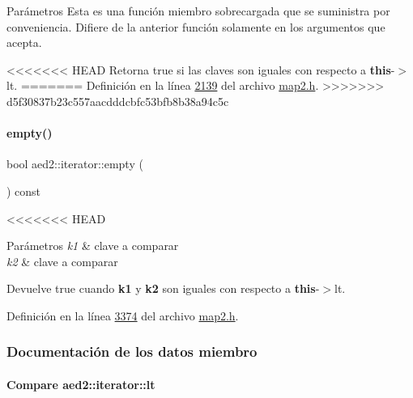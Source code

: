 \begin{DoxyParams}{\-Parámetros}
Esta es una función miembro sobrecargada que se suministra por conveniencia. Difiere de la anterior función solamente en los argumentos que acepta. 

<<<<<<< HEAD
\-Retorna true si las claves son iguales con respecto a {\bfseries this}-\/$>$lt. 
=======
Definición en la línea \hyperlink{map2_8h_source_l02139}{2139} del archivo \hyperlink{map2_8h_source}{map2.\+h}.
>>>>>>> d5f30837b23c557aacdddcbfc53bfb8b38a94c5c

\mbox{\label{classaed2_1_1iterator_a7f98e1c0896c0d960a9dc020a0a4edb8_a7f98e1c0896c0d960a9dc020a0a4edb8}} 
\paragraph{\texorpdfstring{empty()}{empty()}}
{\footnotesize\ttfamily bool aed2\+::iterator\+::empty (\begin{DoxyParamCaption}{ }\end{DoxyParamCaption}) const\hspace{0.3cm}{\ttfamily [inline]}}

<<<<<<< HEAD
\begin{DoxyParams}{\-Parámetros}
{\em k1} & clave a comparar \\
\hline
{\em k2} & clave a comparar \\
\hline
\end{DoxyParams}
\begin{DoxyReturn}{\-Devuelve}
true cuando {\bfseries k1} y {\bfseries k2} son iguales con respecto a {\bfseries this}-\/$>$lt. 
\end{DoxyReturn}


\-Definición en la línea \hyperlink{map2_8h_source_l03374}{3374} del archivo \hyperlink{map2_8h_source}{map2.\-h}.



\subsubsection{\-Documentación de los datos miembro}
\hypertarget{classaed2_1_1iterator_a3f219bfe5e047bbec03e3339770ae414_a3f219bfe5e047bbec03e3339770ae414}{
\paragraph[{lt}]{\setlength{\rightskip}{0pt plus 5cm}\-Compare {\bf aed2\-::iterator\-::lt}}}\label{classaed2_1_1iterator_a3f219bfe5e047bbec03e3339770ae414_a3f219bfe5e047bbec03e3339770ae414}



\end{DoxyParams}
